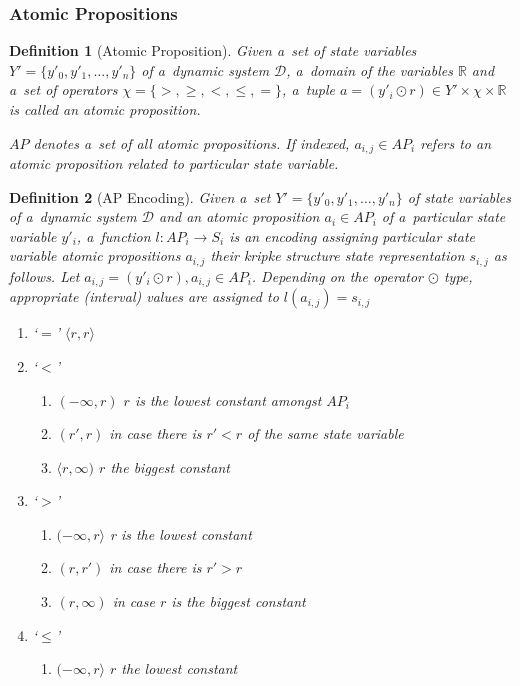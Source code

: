 \documentclass[12pt,oneside,draft]{fithesis}
\newcommand{\mD}{\mathcal{D}}
\newcommand{\mReal}{\mathbb{R}}
\newtheorem{mydef}{Definition}
\begin{document}
\subsubsection{Atomic Propositions}
\begin{mydef}[Atomic Proposition]
Given a~set of state variables  $Y'=\{y'_0,y'_1,\dotsc,y'_n\}$ of
a~dynamic system $\mD$, a~domain of the variables $\mReal$ and
a~set of operators $\chi=\{>,\geq,<,\leq,=\}$, a~tuple
$a=(y'_i\odot r)\in Y'\times\chi\times\mReal$ is called an atomic
proposition.

$AP$ denotes a~set of all atomic propositions.
If indexed, $a_{i,j}\in AP_i$ refers to an atomic proposition related to
particular state variable.
\end{mydef}


\begin{mydef}[AP Encoding]
Given a~set $Y'=\{y'_0,y'_1,\dotsc,y'_n\}$ of state variables of
a~dynamic system $\mD$ and an atomic proposition $a_i\in AP_i$ of
a~particular state variable $y'_i$, a~function
$l:AP_i\rightarrow S_i$ is an encoding assigning particular state
variable atomic propositions $a_{i,j}$ their
kripke structure state representation $s_{i,j}$ as follows.
Let $a_{i,j}=(y'_i\odot r), a_{i,j}\in AP_i$. Depending on the
operator $\odot$ type, appropriate (interval) values are assigned
to $l(a_{i,j})=s_{i,j}$
	\begin{enumerate}
		\item{`$=$'} $\langle r,r\rangle$
		\item{`$<$'}
			\begin{enumerate}
				\item{$(-\infty,r)$} $r$ is the lowest constant
					amongst $AP_i$
				\item{$(r',r)$} in case there is $r'<r$ of the same
					state variable
				\item{$\langle r,\infty)$} $r$ the biggest constant
			\end{enumerate}
		\item{`$>$'}
			\begin{enumerate}
				\item{$(-\infty,r\rangle$} r is the lowest constant
				\item{$(r,r')$} in case there is $r'>r$
				\item{$(r,\infty)$} in case $r$ is the biggest constant
			\end{enumerate}
		\item{`$\leq$'}
			\begin{enumerate}
				\item{$(-\infty,r\rangle$} $r$ the lowest constant

\end{enumerate}
\end{enumerate}
\end{mydef}
\end{document}

